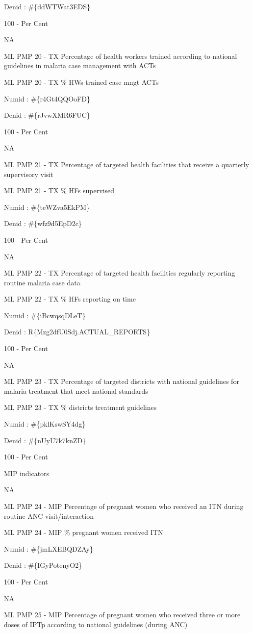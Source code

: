 \documentclass[]{book}
\begin{document}
Denid : \#\{ddWTWat3EDS\}

100 - Per Cent

NA

ML PMP 20 - TX Percentage of health workers trained according to national guidelines in malaria case management with ACTs

ML PMP 20 - TX \% HWs trained case mngt ACTs

Numid : \#\{r4Gt4QQOoFD\}

Denid : \#\{rJvwXMR6FUC\}

100 - Per Cent

NA

ML PMP 21 - TX Percentage of targeted health facilities that receive a quarterly supervisory visit

ML PMP 21 - TX \% HFs supervised

Numid : \#\{teWZva5EkPM\}

Denid : \#\{wfz9d5EpD2c\}

100 - Per Cent

NA

ML PMP 22 - TX Percentage of targeted health facilities regularly reporting routine malaria case data

ML PMP 22 - TX \% HFs reporting on time

Numid : \#\{iBcwqsqDLeT\}

Denid : R\{Mzg2dfU0Sdj.ACTUAL\_REPORTS\}

100 - Per Cent

NA

ML PMP 23 - TX Percentage of targeted districts with national guidelines for malaria treatment that meet national standards

ML PMP 23 - TX \% districts treatment guidelines

Numid : \#\{pklKswSY4dg\}

Denid : \#\{nUyU7k7knZD\}

100 - Per Cent

MIP indicators

NA

ML PMP 24 - MIP Percentage of pregnant women who received an ITN during routine ANC visit/interaction

ML PMP 24 - MIP \% pregnant women received ITN

Numid : \#\{jmLXEBQDZAy\}

Denid : \#\{IGyPotenyO2\}

100 - Per Cent

NA

ML PMP 25 - MIP Percentage of pregnant women who received three or more doses of IPTp according to national guidelines (during ANC)
\end{document}
